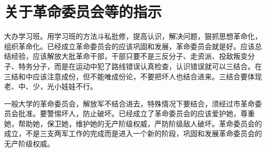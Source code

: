 \section[关于革命委员会等的指示（一九六八年二月）]{关于革命委员会等的指示}


大办学习班。用学习班的方法斗私批修，提高认识，解决问题，狠抓思想革命化，组织革命化。已经成立革命委员会的应该巩固和发展，革命委员会就是好。应该总结经验，应该解放大批革命干部，干部只要不是三反分子、走资派、投敌叛变分子、特务分子，而是在运动中犯了路线错误认真检查，认识错误就可以三结合。在三结和中应该注意成份，但不能唯成份论，不要把坏人也结合进来。三结合要体现老、中、少，光小娃娃不行。

一般大学的革命委员会，解放军不结合进去，特殊情况下要结合，须经过市革命委员会批准。要警惕坏人，防止破坏。已经成立了革命委员会的应该爱护她，尊重她，帮助她，保卫她，维护她的无产阶级权威，严防阶级敌人破坏。革命委员会的成立，不是三支两军工作的完成而是进入一个新的阶段，巩固和发展革命委员会的无产阶级权威。


